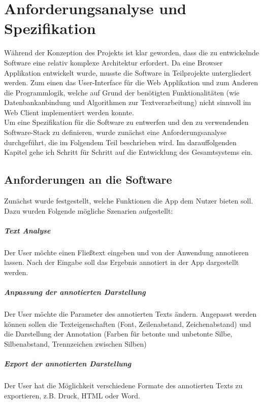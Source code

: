 
\chapter{Anforderungsanalyse und Spezifikation}

Während der Konzeption des Projekts ist klar geworden, dass die zu entwickelnde Software eine relativ komplexe Architektur erfordert. Da eine Browser Applikation entwickelt wurde, musste die Software in Teilprojekte untergliedert werden. Zum einen das User-Interface für die Web Applikation und zum Anderen die Programmlogik, welche auf Grund der benötigten Funktionalitäten (wie Datenbankanbindung und Algorithmen zur Textverarbeitung) nicht sinnvoll im Web Client implementiert werden konnte.\\
Um eine Spezifikation für die Software zu entwerfen und den zu verwendenden Software-Stack zu definieren, wurde zunächst eine Anforderungsanalyse durchgeführt, die im Folgendem Teil beschrieben wird. Im darauffolgenden Kapitel gehe ich Schritt für Schritt auf die Entwicklung des Gesamtsystems ein.

\section{Anforderungen an die Software}

Zunächst wurde festgestellt, welche Funktionen die App dem Nutzer bieten soll. Dazu wurden Folgende mögliche Szenarien aufgestellt:

\paragraph{Text Analyse} 
Der User möchte einen Fließtext eingeben und von der Anwendung annotieren lassen. Nach der Eingabe soll das Ergebnis annotiert in der App dargestellt werden.

\paragraph{Anpassung der annotierten Darstellung}
Der User möchte die Parameter des annotierten Texts ändern. Angepasst werden können sollen die Texteigenschaften (Font, Zeilenabstand, Zeichenabstand) und die Darstellung der Annotation (Farben für betonte und unbetonte Silbe, Silbenabstand, Trennzeichen zwischen Silben)

\paragraph{Export der annotierten Darstellung}
Der User hat die Möglichkeit verschiedene Formate des annotierten Texts zu exportieren, z.B. Druck, HTML oder Word.


